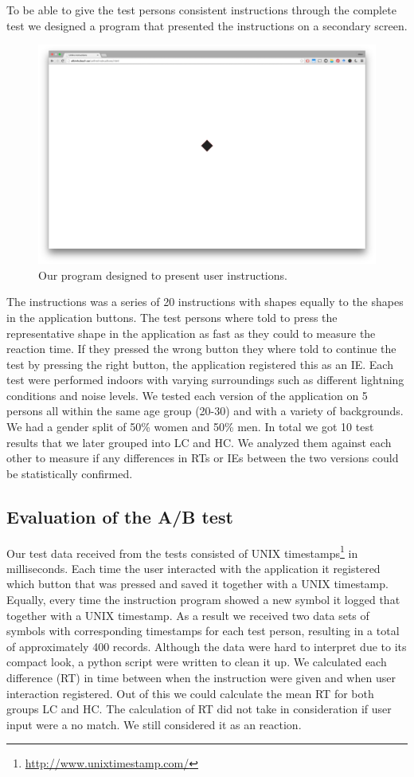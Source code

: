 \documentclass[runningheads,a4paper]{llncs}
\begin{document}
To be able to give the test persons consistent instructions through the complete test we designed a program that presented the instructions on a secondary screen. 
\begin{figure}
	\centering
	\includegraphics[width=\textwidth]{instructions}
	\caption{Our program designed to present user instructions.
	\label{fig:instructions}}
\end{figure}
The instructions was a series of 20 instructions with shapes equally to the shapes in the application buttons. The test persons where told to press the representative shape in the application as fast as they could to measure the reaction time. If they pressed the wrong button they where told to continue the test by pressing the right button, the application registered this as an IE. Each test were performed indoors with varying surroundings such as different lightning conditions and noise levels. We tested each version of the application on 5 persons all within the same age group (20-30) and with a variety of backgrounds. We had a gender split of 50\% women and 50\% men. In total we got 10 test results that we later grouped into LC and HC. We analyzed them against each other to measure if any differences in RTs or IEs between the two versions could be statistically confirmed.

\subsection{Evaluation of the A/B test}
Our test data received from the tests consisted of UNIX timestamps\footnote{\url{http://www.unixtimestamp.com/}} in milliseconds. Each time the user interacted with the application it registered which button that was pressed and saved it together with a UNIX timestamp. Equally, every time the instruction program showed a new symbol it logged that together with a UNIX timestamp. As a result we received two data sets of symbols with corresponding timestamps for each test person, resulting in a total of approximately 400 records. Although the data were hard to interpret due to its compact look, a python script were written to clean it up. We calculated each difference (RT) in time between when the instruction were given and when user interaction registered. Out of this we could calculate the mean RT for both groups LC and HC. The calculation of RT did not take in consideration if user input were a no match. We still considered it as an reaction.
\end{document}

